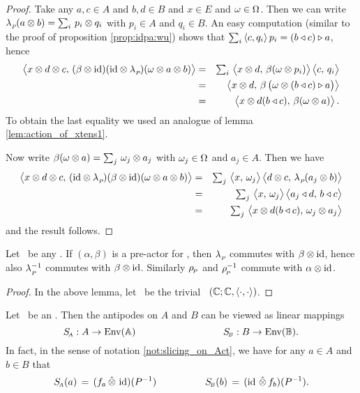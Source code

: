 \begin{proof}
Take any\/ $a,c\in A$ and\/ $b,d\in B$ and\/ $x\in E$ and\/ $\omega\in \Omega$.
Then we can write $\lambda_{_P\!}(a \otimes b) = \sum_i \,p_i \otimes q_i$ with $p_i \in A$ and $q_i \in B$.
An easy computation (similar to the proof of proposition \ref{prop:idpa:wu})
shows that $\sum_i \, \langle c,q_i \rangle\,p_i = (b \triangleleft c) \triangleright a$, hence
\begin{eqnarray*}
     \pairM{x \tens d \tens c}{(\beta \tens \id)(\id \tens \lp)(\om \tens a \tens b)}
  &=&
    \textstyle \sum_i \, \pairM{x \tens d}{\beta(\om \tens p_i)} \pairM{c}{q_i}
\\&=&
    \pairM{x \tens d}{\beta\left(\vertM \om \tens (b \ract c) \lact a \right)}
\\&=&
    \pairM{x \tens d (b \ract c)}{\beta(\om \tens a)}.
\end{eqnarray*}
To obtain the last equality we used an analogue of lemma \ref{lem:action_of_xtens1}\@.

Now write $\beta(\omega \otimes a)= \sum_j \,\omega_j \otimes a_j$ with $\omega_j\in\Omega$ and  $a_j \in A$.
Then we have
\begin{eqnarray*}
 \pairM{x \tens d \tens c}{(\id \tens \lp)(\beta \tens \id)(\om \tens a \tens b)}
   &=&
      \textstyle \sum_j \, \pairM{x}{\om_j} \pairM{d \tens c}{\lp(a_j \tens b)}
 \\&=&
      \textstyle \sum_j \, \pairM{x}{\om_j} \pairM{a_j \ract d}{b\ract c}
 \\&=&
      \textstyle \sum_j \, \pairM{x \tens d(b\ract c)}{\om_j \tens a_j}
\end{eqnarray*}
and the result follows.
\end{proof}

\begin{cor_sec}
Let\/ \pairAB\ be any\/ \idpa\@.
If\/ $(\alpha,\beta)$ is a pre-actor for\/ \BB, then\/ $\lambda_{_P\!}$ commutes with\/ $\beta \otimes\mbox{\rm id}$,
hence also\/ $\lambda_{_P\!}^{-1}$ commutes with\/ $\beta \otimes \mbox{\rm id}$.
Similarly\/ $\rho_{_{\!P}}$ and $\rho_{_{\!P}}^{-1}$ commute with\/ $\alpha \otimes \mbox{\rm id}$.
\end{cor_sec}
\begin{proof}
In the above lemma, let \EE\ be the trivial \context\ $(\mathbb{C}; \mathbb{C}, \langle\cdot, \cdot\rangle)$.
\end{proof}



\begin{prop_sec}
Let\/ \pairAB\ be an \idpa\@.
Then the antipodes on $A$ and\/ $B$ can be viewed as linear mappings
$$ S_{\scriptscriptstyle \! A} : A \rightarrow \mbox{\rm Env}(\mathbb{A})     \hspace{9em}
   S_{\scriptscriptstyle \! B} : B \rightarrow \mbox{\rm Env}(\mathbb{B}). $$
In fact, in the sense of notation \ref{not:slicing_on_Act}, we have
for any $a \in A$ and $b \in B$ that
\begin{equation}\label{eq:antipodes:slice:Pinverse}
    S_{\scriptscriptstyle \! A}(a) \,=\,  (f_a \,\hat{\otimes}\, \, \mbox{\rm id})(P^{-1})
                     \hspace{5em}
    S_{\scriptscriptstyle \! B}(b) \,=\,  (\mbox{\rm id}\, \,\hat{\otimes}\, f_b)(P^{-1}).
\end{equation}
\end{prop_sec}

